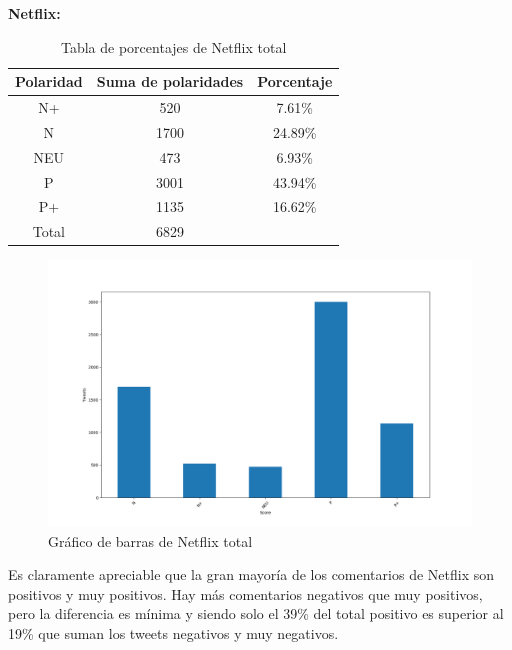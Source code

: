 \textbf{Netflix: }

\begin{table}[H]
	\centering
	\begin{tabular}{|c|c|c|}
		\hline 
		Polaridad& Suma de polaridades & Porcentaje \\ 
		\hline 
		N+& 520 & 7.61\% \\ 
		\hline 
		N& 1700 &  24.89\%\\ 
		\hline 
		NEU& 473 & 6.93\% \\ 
		\hline 
		P& 3001 & 43.94\% \\ 
		\hline 
		P+& 1135 & 16.62\% \\ 
		\hline 
		Total & 6829 & \\
		\hline
	\end{tabular} 
	\caption{Tabla de porcentajes de Netflix total}
	\label{tbl:porcentaje-NetflixAll}
\end{table}

 \begin{figure}[H]
	\centering
	
	 \includegraphics[scale=.3]{imagenes/barrasNetflixAll.png}
		
	
		
	\caption{Gráfico de barras de Netflix total} 
	\label{fig:NetflixAll}
\end{figure}





Es claramente apreciable que la gran mayoría de los comentarios de Netflix son positivos y muy positivos. Hay más comentarios negativos que muy positivos,  pero la diferencia es mínima y siendo solo el 39\% del total positivo es superior al 19\% que suman los tweets negativos y muy negativos. 




